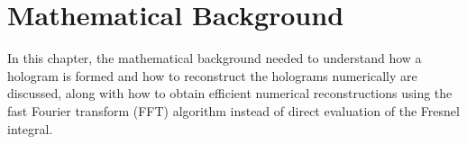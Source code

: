 %
%
%
%
%
%
%
%
%
%
%

\chapter{Mathematical Background} \label{chap:Math}
In this chapter, the mathematical background needed to understand how a
hologram is formed and how to reconstruct the holograms numerically are
discussed, along with how to obtain efficient numerical reconstructions using
the fast Fourier transform (FFT) algorithm instead of direct evaluation of the Fresnel integral.

